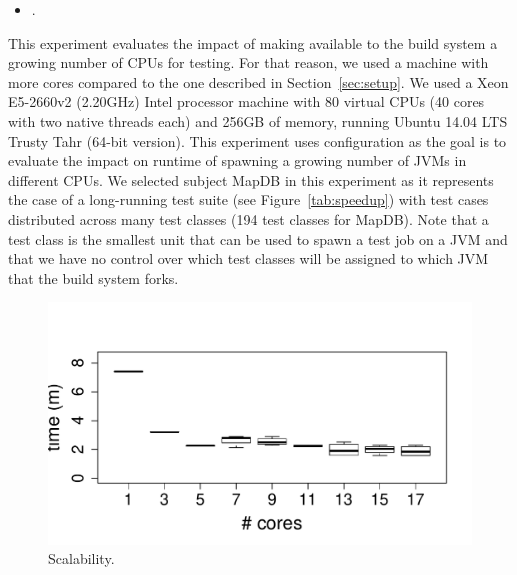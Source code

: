 
\begin{center}
\end{center}

\begin{itemize}
    \item \numRQSpeedupTwo{}. \textbf{\RQSpeedupTwo}
\end{itemize}

\newcommand{\subjectScalability}{MapDB}

This experiment evaluates the impact of making available to the build
system a growing number of CPUs for testing.  For that reason, we used
a machine with more cores compared to the one described in
Section~\ref{sec:setup}.  We used a Xeon E5-2660v2 (2.20GHz) Intel
processor machine with 80 virtual CPUs (40 cores with two native
threads each) and 256GB of memory, running Ubuntu 14.04 LTS Trusty
Tahr (64-bit version). This experiment uses configuration \emph{\ForkSeq{}}
as the goal is to evaluate the impact on runtime of spawning a growing number of
JVMs in different CPUs.  We selected subject
\subjectScalability{} in this experiment as it represents the case of a long-running test
suite (see Figure~\ref{tab:speedup}) with test cases distributed
across many test classes (194 test classes for \subjectScalability{}).
Note that a test class is the smallest unit that can be used to spawn
a test job on a JVM and that we have no control over which test
classes will be assigned to which JVM that the build system forks.

\begin{figure}[h]
    \centering
    \includegraphics[width=.35\textwidth]{R/scalability/scalability.pdf}
    \caption{\label{fig:scalability}Scalability.}
\end{figure}

